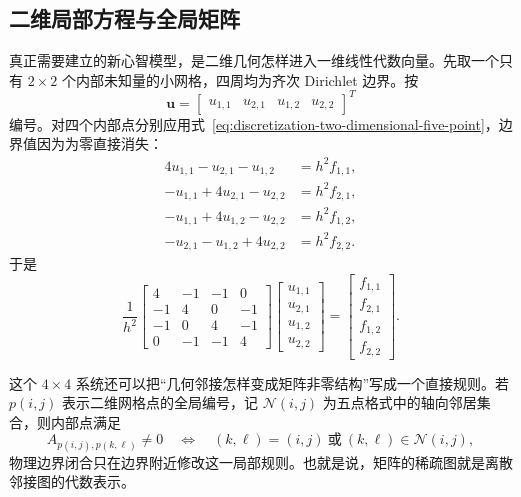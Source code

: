 \subsection{二维局部方程与全局矩阵}

真正需要建立的新心智模型，是二维几何怎样进入一维线性代数向量。先取一个只有 $2\times2$ 个内部未知量的小网格，四周均为齐次 Dirichlet 边界。按
\begin{equation}
\bm u=
\begin{bmatrix}
 u_{1,1}&u_{2,1}&u_{1,2}&u_{2,2}
\end{bmatrix}^{T}
\end{equation}
编号。对四个内部点分别应用式~\eqref{eq:discretization-two-dimensional-five-point}，边界值因为为零直接消失：
\begin{align}
4u_{1,1}-u_{2,1}-u_{1,2}&=h^2f_{1,1},\\
-u_{1,1}+4u_{2,1}-u_{2,2}&=h^2f_{2,1},\\
-u_{1,1}+4u_{1,2}-u_{2,2}&=h^2f_{1,2},\\
-u_{2,1}-u_{1,2}+4u_{2,2}&=h^2f_{2,2}.
\end{align}
于是
\begin{equation}
\boxed{
\frac1{h^2}
\begin{bmatrix}
4&-1&-1&0\\
-1&4&0&-1\\
-1&0&4&-1\\
0&-1&-1&4
\end{bmatrix}
\begin{bmatrix}
u_{1,1}\\u_{2,1}\\u_{1,2}\\u_{2,2}
\end{bmatrix}
=
\begin{bmatrix}
f_{1,1}\\f_{2,1}\\f_{1,2}\\f_{2,2}
\end{bmatrix}.
}
\label{eq:discretization-two-dimensional-small-matrix}
\end{equation}

这个 $4\times4$ 系统还可以把“几何邻接怎样变成矩阵非零结构”写成一个直接规则。若 $p(i,j)$ 表示二维网格点的全局编号，记 $\mathcal N(i,j)$ 为五点格式中的轴向邻居集合，则内部点满足
\begin{equation}
A_{p(i,j),p(k,\ell)}\neq0
\quad\Longleftrightarrow\quad
(k,\ell)=(i,j)
\ \text{或}\
(k,\ell)\in\mathcal N(i,j),
\label{eq:discretization-geometry-to-sparsity}
\end{equation}
物理边界闭合只在边界附近修改这一局部规则。也就是说，矩阵的稀疏图就是离散邻接图的代数表示。

